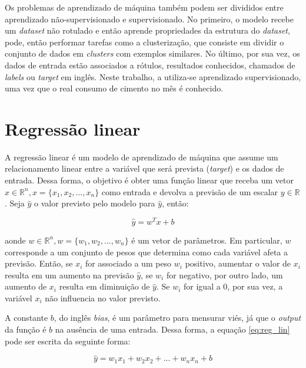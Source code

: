 Os problemas de aprendizado de máquina também podem ser divididos entre
 aprendizado não-supervisionado e supervisionado. No primeiro, o modelo recebe
um \textit{dataset} não rotulado e então aprende propriedades da estrutura do \textit{dataset}, pode, então
performar tarefas como a clusterização, que consiste em dividir o conjunto de dados
em \textit{clusters} com exemplos similares. No último, por sua vez, os dados de 
entrada estão associados a rótulos, resultados conhecidos, chamados de \textit{labels} ou
\textit{target} em inglês. Neste trabalho, a utiliza-se aprendizado supervisionado, uma vez 
que o real consumo de cimento no mês é conhecido.\cite{Goodfellow-et-al-2016}

  
\section{Regressão linear}
\label{sec:reg_lin}

A regressão linear é um modelo de aprendizado de máquina que assume um relacionamento
linear entre a variável que será prevista (\textit{target}) e os dados de entrada.
Dessa forma, o objetivo é obter uma função linear que receba um vetor 
$x \in \mathbb{R}^n , x=\{x_1, x_2, ..., x_n\}$
como entrada e devolva a previsão de um escalar $y \in \mathbb{R}$. \cite{Goodfellow-et-al-2016}
Seja $\hat{y}$ o valor previsto pelo modelo para $\hat{y}$, então:

\begin{equation}
  \label{eq:reg_lin}
  \hat{y} = w^T x + b
\end{equation}

aonde $ w \in \mathbb{R}^n, w=\{w_1, w_2, ..., w_n\}$ é um vetor de parâmetros. Em 
particular, $w$ corresponde a um conjunto de pesos que 
determina como cada variável afeta a previsão. Então, se $x_i$
for associado a um peso $w_i$ positivo, aumentar o valor de $x_i$
resulta em um aumento na previsão $\hat{y}$, se $w_i$ for negativo, 
por outro lado, um aumento de $x_i$ resulta em diminuição de 
$\hat{y}$. Se $w_i$ for igual a 0, por sua vez, a 
variável $x_i$ não influencia no valor previsto.

A constante $b$, do inglês \textit{bias}, é um parâmetro para
mensurar viés, já que o \textit{output} da função é $b$ na ausência
de uma entrada. Dessa forma, a equação \ref{eq:reg_lin} pode ser escrita da 
seguinte forma: 

\begin{equation}
  \hat{y} = w_1 x_1 + w_2 x_2 + ... + w_n x_n + b
\end{equation}

